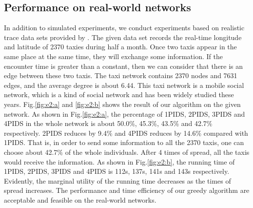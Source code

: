 \subsection{Performance on real-world networks}
In addition to simulated experiments, we conduct experiments based on realistic trace data sets provided by \cite{sju}. The given data set records the real-time longitude and latitude of 2370 taxies during half a month. Once two taxis appear in the same place at the same time, they will exchange some information. If the encounter time is greater than a constant, then we can consider that there is an edge between these two taxis. The taxi network contains 2370 nodes and 7631 edges, and the average degree is about 6.44. This taxi network is a mobile social network, which is a kind of social network and has been widely studied these years.  Fig.\ref{fig:e2:a} and \ref{fig:e2:b} shows the result of our algorithm on the given network.
As shown in Fig.\ref{fig:e2:a}, the percentage of 1PIDS, 2PIDS, 3PIDS and 4PIDS in the whole network is about 50.0\%, 45.3\%, 43.5\% and 42.7\% respectively. 2PIDS reduces by 9.4\% and 4PIDS reduces by 14.6\% compared with 1PIDS. That is, in order to send some information to all the 2370 taxis, one can choose about 42.7\% of the whole individuals. After 4 times of spread, all the taxis would receive the information. As shown in Fig.\ref{fig:e2:b}, the running time of 1PIDS, 2PIDS, 3PIDS and 4PIDS is 112s, 137s, 141s and 143s respectively. Evidently, the marginal utility of the running time decreases as the times of spread increases. The performance and time efficiency of our greedy algorithm are acceptable and feasible on the real-world networks.
